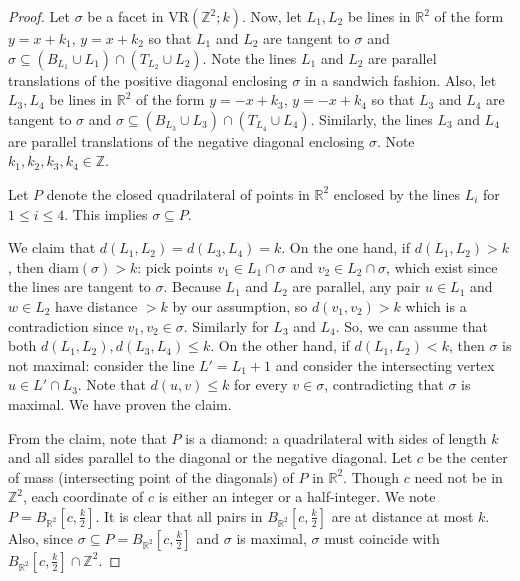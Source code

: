 \documentclass[12pt,a4paper]{amsart}
\theoremstyle{definition}
\newcommand{\R}{\ensuremath{\mathbb{R}}}
\newcommand{\Z}{\ensuremath{\mathbb{Z}}}
\newcommand{\vr}[2]{\mathrm{VR}(#1;#2)}
\newcommand{\diam}{\ensuremath{\mathrm{diam}}}
\numberwithin{equation}{section}
\begin{document}
\begin{proof}
Let $\sigma$ be a facet in $\vr{\Z^2}{k}$.
Now, let $L_1, L_2$ be lines in $\R^2$ of the form $y=x+k_1$, $y=x+k_2$ so that $L_1$ and $L_2$ are tangent to $\sigma$ and $\sigma \subseteq (B_{L_1} \cup L_1) \cap (T_{L_2} \cup L_2)$.
Note the lines $L_1$ and $L_2$ are parallel translations of the positive diagonal enclosing $\sigma$ in a sandwich fashion.
Also, let $L_3, L_4$ be lines in $\R^2$ of the form $y=-x+k_3$, $y=-x+k_4$ so that $L_3$ and $L_4$ are tangent to $\sigma$ and $\sigma \subseteq (B_{L_3} \cup L_3) \cap (T_{L_4} \cup L_4)$.
Similarly, the lines $L_3$ and $L_4$ are parallel translations of the negative diagonal enclosing $\sigma$.
Note $k_1,k_2,k_3,k_4\in\Z$.

Let $P$ denote the closed quadrilateral of points in $\R^2$ enclosed by the lines $L_i$ for $1\leq i \leq 4$.
This implies $\sigma \subseteq P$.

We claim that $d(L_1, L_2) = d(L_3, L_4) = k$.
On the one hand, if $d(L_1, L_2)> k$, then $\diam(\sigma) >k$: pick points $v_1 \in L_1 \cap \sigma$ and $v_2 \in L_2 \cap \sigma$, which exist since the lines are tangent to $\sigma$.
Because $L_1$ and $L_2$ are parallel, any pair $u \in L_1$ and $w\in L_2$ have distance $>k$ by our assumption, so $d(v_1, v_2) >k$ which is a contradiction since $v_1, v_2 \in \sigma$.
Similarly for $L_3$ and $L_4$.
So, we can assume that both $d(L_1, L_2), d(L_3, L_4) \leq k$.
On the other hand, if $d(L_1, L_2) < k$, then $\sigma$ is not maximal: consider the line $L' = L_1+1$ and consider the intersecting vertex $u \in L'\cap L_3$.
Note that $d(u,v) \leq k$ for every $v\in \sigma$, contradicting that $\sigma$ is maximal.
We have proven the claim.

From the claim, note that $P$ is a diamond: a quadrilateral with sides of length $k$ and all sides parallel to the diagonal or the negative diagonal.
Let $c$ be the center of mass (intersecting point of the diagonals) of $P$ in $\R^2$.
Though $c$ need not be in $\Z^2$, each coordinate of $c$ is either an integer or a half-integer.
We note $P=B_{\R^2}[c,\frac{k}{2}]$.
It is clear that all pairs in $B_{\R^2}[c,\frac{k}{2}]$ are at distance at most $k$.
Also, since $\sigma \subseteq P = B_{\R^2}[c,\frac{k}{2}]$ and $\sigma$ is maximal, $\sigma$ must coincide with $B_{\R^2}[c,\frac{k}{2}] \cap \Z^2$.
\end{proof}
\end{document}

